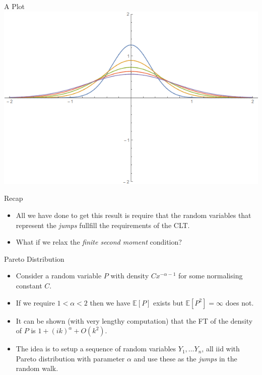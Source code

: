\documentclass[pdf]{beamer}
\begin{document}
\begin{frame}{A Plot}
    \includegraphics[scale=0.4]{Diffusion}
\end{frame}

\begin{frame}{Recap}
    \begin{itemize}
        \item All we have done to get this result is require that the random variables that represent the \emph{jumps} fullfill the requirements of the CLT.
        \item What if we relax the \emph{finite second moment} condition?
    \end{itemize}
\end{frame}
\begin{frame}{Pareto Distribution}
    \begin{itemize}
        \item Consider a random variable $ P $ with density $ Cx^{-\alpha-1} $ for some normalising constant $ C $.
        \item If we require $ 1 < \alpha < 2 $ then we have $ \mathbb{E}[P] $ exists but $ \mathbb{E}[P^2] = \infty $ does not.
        \item It can be shown (with very lengthy computation) that the FT of the density of $ P $ is $ 1 + (ik)^\alpha + O(k^2) $.
        \item The idea is to setup a sequence of random variables $ Y_1, \ldots Y_n $, all iid with Pareto distribution with parameter $ \alpha $ and use these as the \emph{jumps} in the random walk.
    \end{itemize}
    
\end{frame}
\end{document}
